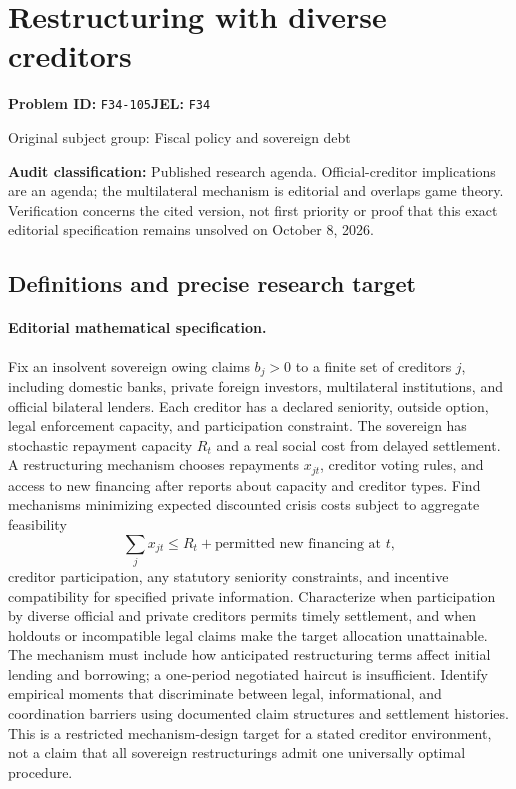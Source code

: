 \documentclass[11pt,a4paper]{article}
\begin{document}
\section*{Restructuring with diverse creditors}
\textbf{Problem ID:} \texttt{F34-105}\quad \textbf{JEL:} \texttt{F34}\par
\label{problem:OP-0256}
{\sffamily\small\color{muted}Original subject group: Fiscal policy and sovereign debt\par}
\label{definitions:problem:30007537}
\textbf{Audit classification:} Published research agenda. Official-creditor implications are an agenda; the multilateral mechanism is editorial and overlaps game theory. Verification concerns the cited version, not first priority or proof that this exact editorial specification remains unsolved on October 8, 2026.
\subsection*{Definitions and precise research target}
\paragraph{Editorial mathematical specification.} Fix an insolvent sovereign owing claims \(b_j>0\) to a finite set of creditors \(j\), including domestic banks, private foreign investors, multilateral institutions, and official bilateral lenders. Each creditor has a declared seniority, outside option, legal enforcement capacity, and participation constraint. The sovereign has stochastic repayment capacity \(R_t\) and a real social cost from delayed settlement. A restructuring mechanism chooses repayments \(x_{jt}\), creditor voting rules, and access to new financing after reports about capacity and creditor types.
Find mechanisms minimizing expected discounted crisis costs subject to aggregate feasibility
\[
\sum_j x_{jt}\le R_t+\text{permitted new financing at }t,
\]
creditor participation, any statutory seniority constraints, and incentive compatibility for specified private information. Characterize when participation by diverse official and private creditors permits timely settlement, and when holdouts or incompatible legal claims make the target allocation unattainable. The mechanism must include how anticipated restructuring terms affect initial lending and borrowing; a one-period negotiated haircut is insufficient. Identify empirical moments that discriminate between legal, informational, and coordination barriers using documented claim structures and settlement histories. This is a restricted mechanism-design target for a stated creditor environment, not a claim that all sovereign restructurings admit one universally optimal procedure.
\end{document}
